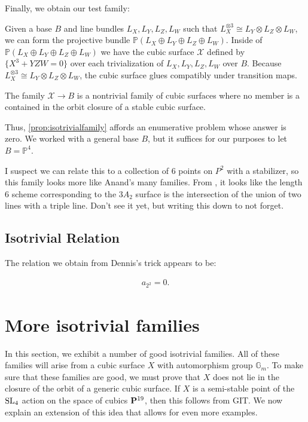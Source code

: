 \documentclass[12pt,reqno]{amsart}
\renewcommand{\to}{{\longrightarrow}}
\numberwithin{equation}{section}
\begin{document}
Finally, we obtain our test family:
\begin{proposition}
\label{prop:isotrivialfamily}
Given a base $B$ and line bundles $L_X, L_Y, L_Z, L_W$ such that $L_X^{\otimes 3}\cong L_Y\otimes L_Z\otimes L_W$, we can form the projective bundle $\mathbb{P}(L_X\oplus L_Y\oplus L_Z\oplus L_W)$. Inside of $\mathbb{P}(L_X\oplus L_Y\oplus L_Z\oplus L_W)$ we have the cubic surface $\mathcal{X}$ defined by $\{X^3 + YZW = 0\}$ over each trivialization of $L_X, L_Y, L_Z, L_W$ over $B$. Because $L_X^{\otimes 3}\cong L_Y\otimes L_Z\otimes L_W$, the cubic surface glues compatibly under transition maps.

The family $\mathcal{X}\to B$ is a nontrivial family of cubic surfaces where no member is a contained in the orbit closure of a stable cubic surface.
\end{proposition}

Thus, \autoref{prop:isotrivialfamily} affords an enumerative problem whose answer is zero. We worked with a general base $B$, but it suffices for our purposes to let $B=\mathbb{P}^4$. 

{\color{red} I suspect we can relate this to a collection of 6 points on $P^2$ with a stabilizer, so this family looks more like Anand's many families. From \cite[Proposition 3.3]{N05}, it looks like the length 6 scheme corresponding to the $3A_2$ surface is the intersection of the union of two lines with a triple line. Don't see it yet, but writing this down to not forget.}

\subsection{Isotrivial Relation}
\label{sec:isotrivial-relation}

The relation we obtain from Dennis's trick appears to be:

\begin{align}
  \label{eq:relationDennis}
  a_{2^{2}} = 0.
\end{align}

\section{More isotrivial families}
In this section, we exhibit a number of good isotrivial families.  All
of these families will arise from a cubic surface $X$ with
automorphism group $\mathbb G_m$.  To make sure that these families
are good, we must prove that $X$ does not lie in the closure of the
orbit of a generic cubic surface.  If $X$ is a semi-stable point of
the $\SL_4$ action on the space of cubics $\P^{19}$, then this follows
from GIT.  We now explain an extension of this idea that allows for
even more examples.
\end{document}
